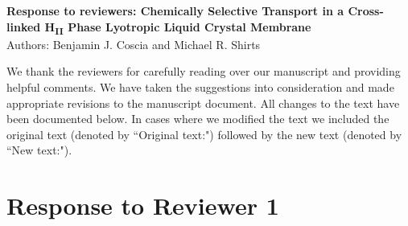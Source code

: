 \documentclass{article}
\begin{document}
\graphicspath{{./figures/}}

\begin{center}
\textbf{Response to reviewers: Chemically Selective Transport in a Cross-linked 
H\textsubscript{II} Phase Lyotropic Liquid Crystal Membrane} \\
Authors: Benjamin J. Coscia and Michael R. Shirts
\end{center}

We thank the reviewers for carefully reading over our manuscript and providing
helpful comments. We have taken the suggestions into consideration and made
appropriate revisions to the manuscript document. All changes to the text have
been documented below. In cases where we modified the text we included the 
original text (denoted by ``Original text:") followed by the new text (denoted by
``New text:").

\section*{Response to Reviewer 1}
\end{document}
